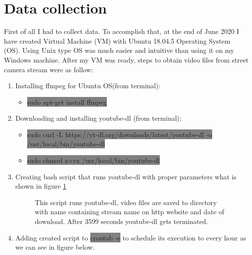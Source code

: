 \section{Data collection}
\label{sec:collection}
First of all I had to collect data. To accomplish that, at the end of June 2020 I have created Virtual Machine (VM) with Ubuntu 18.04.5 Operating System (OS). Using Unix type OS was much easier and intuitive than using it on my Windows machine. After my VM was ready, steps to obtain video files from street camera stream were as follow:
\begin{enumerate}
    \item Installing ffmpeg for Ubuntu OS(from terminal):
    \begin{itemize}
        \item \colorbox{Gray}{sudo apt-get install ffmpeg}
    \end{itemize}
    \item Downloading and installing youtube-dl (from terminal):
    \begin{itemize}
        \item \colorbox{Gray}{sudo curl -L https://yt-dl.org/downloads/latest/youtube-dl -o /usr/local/bin/youtube-dl}
        \item \colorbox{Gray}{sudo chmod a+rx /usr/local/bin/youtube-dl}
    \end{itemize}
    \item Creating bash script that runs youtube-dl with proper parameters what is shown in figure \ref{fig:script}
    \begin{figure}[H]
        \centering
        \caption{This script runs youtube-dl, video files are saved to  directory with name containing stream name on http website and date of download. After 3599 seconds youtube-dl gets terminated.}
        \label{fig:script}
    \end{figure}
    \item Adding created script to \colorbox{Gray}{crontab -e} to schedule its execution to every hour as we can see in figure below.
    \begin{figure}[H]
        \centering

\end{figure}
\end{enumerate}

